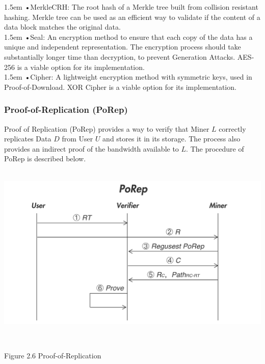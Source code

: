 \documentclass[10pt,a4paper]{article}
\begin{document}
\hangindent 1.5em
\noindent   
•\quad MerkleCRH: The root hash of a Merkle tree built from collision resistant hashing. Merkle tree can be used as an efficient way to validate if the content of a data block matches the original data.
\vspace{-0.8em}
\\

\hangindent 1.5em
\noindent   
•\quad Seal: An encryption method to ensure that each copy of the data has a unique and independent representation. The encryption process should take substantially longer time than decryption, to prevent Generation Attacks. AES-256 is a viable option for its implementation.
\vspace{-0.8em}
\\

\hangindent 1.5em
\noindent   
•\quad Cipher: A lightweight encryption method with symmetric keys, used in Proof-of-Download. XOR Cipher is a viable option for its implementation.  
\vspace{-0.5em}

               \subsubsection{Proof-of-Replication (PoRep)}  %
               
Proof of Replication (PoRep) provides a way to verify that Miner $L$ correctly replicates Data $D$ from User $U$ and stores it in its storage. The process also provides an indirect proof of the bandwidth available to $L$. The procedure of PoRep is described below.
\vspace{-0.8em}
\\ \\ 
\centerline{\includegraphics[width=440pt]{fig6}}
 \\\centerline{{Figure 2.6 Proof-of-Replication}}
\vspace{-1.5em}
\\
\end{document}
